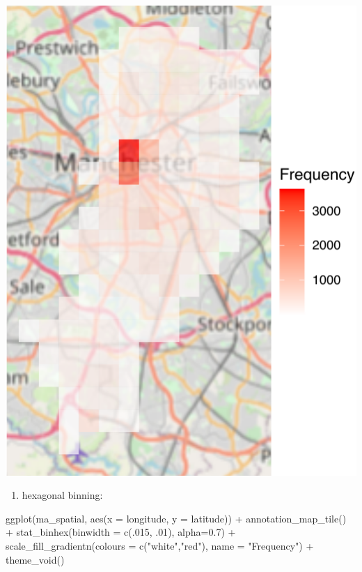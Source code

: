 \documentclass[
]{book}
\newenvironment{Shaded}{\begin{snugshade}}{\end{snugshade}}
\newcommand{\AttributeTok}[1]{\textcolor[rgb]{0.77,0.63,0.00}{#1}}
\newcommand{\DecValTok}[1]{\textcolor[rgb]{0.00,0.00,0.81}{#1}}
\newcommand{\FloatTok}[1]{\textcolor[rgb]{0.00,0.00,0.81}{#1}}
\newcommand{\FunctionTok}[1]{\textcolor[rgb]{0.00,0.00,0.00}{#1}}
\newcommand{\NormalTok}[1]{#1}
\newcommand{\SpecialCharTok}[1]{\textcolor[rgb]{0.00,0.00,0.00}{#1}}
\newcommand{\StringTok}[1]{\textcolor[rgb]{0.31,0.60,0.02}{#1}}
\providecommand{\tightlist}{%
  \setlength{\itemsep}{0pt}\setlength{\parskip}{0pt}}
\begin{document}
\includegraphics{crime_mapping_files/figure-latex/unnamed-chunk-128-1.pdf}

\begin{enumerate}
\def\labelenumi{\alph{enumi})}
\setcounter{enumi}{1}
\tightlist
\item
  hexagonal binning:
\end{enumerate}

\begin{Shaded}
\begin{Highlighting}[]
\FunctionTok{ggplot}\NormalTok{(ma\_spatial, }\FunctionTok{aes}\NormalTok{(}\AttributeTok{x =}\NormalTok{ longitude, }\AttributeTok{y =}\NormalTok{ latitude)) }\SpecialCharTok{+} 
  \FunctionTok{annotation\_map\_tile}\NormalTok{() }\SpecialCharTok{+} 
  \FunctionTok{stat\_binhex}\NormalTok{(}\AttributeTok{binwidth =} \FunctionTok{c}\NormalTok{(.}\DecValTok{015}\NormalTok{, .}\DecValTok{01}\NormalTok{), }\AttributeTok{alpha=}\FloatTok{0.7}\NormalTok{) }\SpecialCharTok{+} 
  \FunctionTok{scale\_fill\_gradientn}\NormalTok{(}\AttributeTok{colours =} \FunctionTok{c}\NormalTok{(}\StringTok{"white"}\NormalTok{,}\StringTok{"red"}\NormalTok{), }
                       \AttributeTok{name =} \StringTok{"Frequency"}\NormalTok{) }\SpecialCharTok{+} 
  \FunctionTok{theme\_void}\NormalTok{()}
\end{Highlighting}
\end{Shaded}
\end{document}
